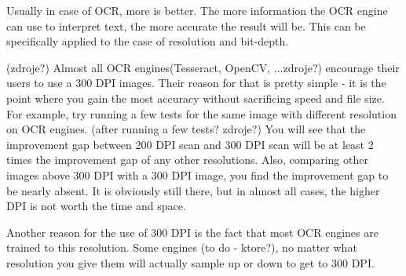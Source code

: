 Usually in case of OCR, more is better. The more information the OCR engine can use to interpret text, the more accurate the result will be. This can be specifically applied to the case of resolution and bit-depth.

(zdroje?)
Almost all OCR engines(Tesseract, OpenCV, ...zdroje?) encourage their users to use a 300 DPI images. Their reason for that is pretty simple - it is the point where you gain the most accuracy without sacrificing speed and file size. For example, try running a few tests for the same image with different resolution on OCR engines. (after running a few tests? zdroje?) You will see that the improvement gap between 200 DPI scan and 300 DPI scan will be at least 2 times the improvement gap of any other resolutions. Also, comparing other images above 300 DPI with a 300 DPI image, you find the improvement gap to be nearly absent. It is obviously still there, but in almost all cases, the higher DPI is not worth the time and space. 

Another reason for the use of 300 DPI is the fact that most OCR engines are trained to this resolution. Some engines (to do - ktore?), no matter what resolution you give them will actually sample up or down to get to 300 DPI. 

